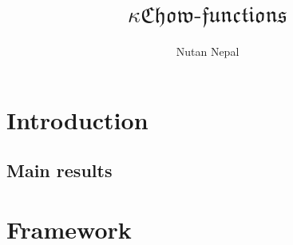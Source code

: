 \documentclass[12pt,letterpaper,english]{amsart}
\title[\(\kappa\mathfrak{Chow\text{-}functions}\)]{\Huge\(\kappa\mathfrak{Chow\text{-}functions}\)}
\author[Nutan Nepal]{Nutan Nepal}
\theoremstyle{teoremas}
\theoremstyle{definition}
\begin{document}
\begin{abstract}

\end{abstract}

\maketitle

\section{Introduction}

\subsection{Main results}

\section{Framework}
\end{document}
